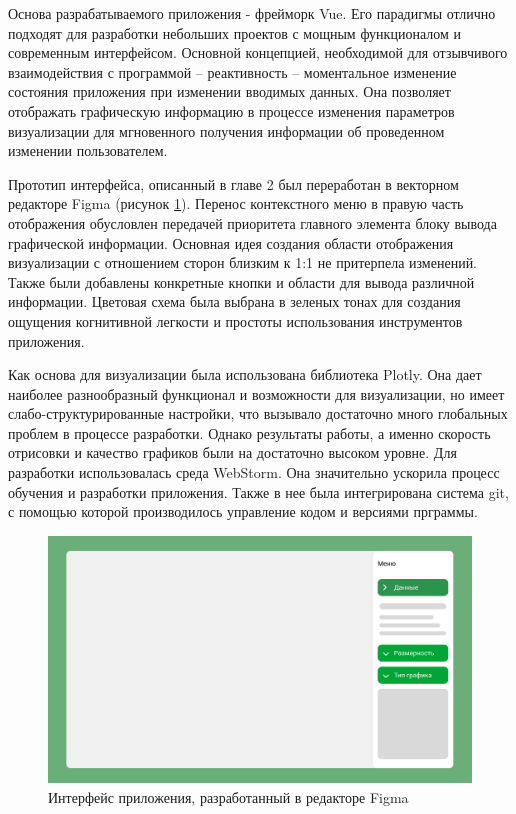 Основа разрабатываемого приложения - фрейморк Vue. Его парадигмы отлично подходят для разработки небольших проектов с мощным функционалом и современным интерфейсом. Основной концепцией, необходимой для отзывчивого взаимодействия с программой -- реактивность -- моментальное изменение состояния приложения при изменении вводимых данных. Она позволяет отображать графическую информацию в процессе изменения параметров визуализации для мгновенного получения информации об проведенном изменении пользователем.

Прототип интерфейса, описанный в главе 2 был переработан в векторном редакторе Figma (рисунок \ref{fig:11}). Перенос контекстного меню в правую часть отображения обусловлен передачей приоритета главного элемента блоку вывода графической информации. Основная идея создания области отображения визуализации с отношением сторон близким к 1:1 не притерпела изменений.
Также были добавлены конкретные кнопки и области для вывода различной информации. Цветовая схема была выбрана в зеленых тонах для создания ощущения когнитивной легкости и простоты использования инструментов приложения.



Как основа для визуализации была использована библиотека Plotly. Она дает наиболее разнообразный функционал и возможности для визуализации, но имеет слабо-структурированные настройки, что вызывало достаточно много глобальных проблем в процессе разработки. Однако результаты работы, а именно скорость отрисовки и качество графиков были на достаточно высоком уровне.
Для разработки использовалась среда WebStorm. Она значительно ускорила процесс обучения и разработки приложения. Также в нее была интегрирована система git, с помощью которой производилось управление кодом и версиями прграммы.

\begin{figure}[h!]
    \center
    \includegraphics[scale=0.5]{fig/Figma.png}
    \caption{Интерфейс приложения, разработанный в редакторе Figma}
    \label{fig:11}
\end{figure}

